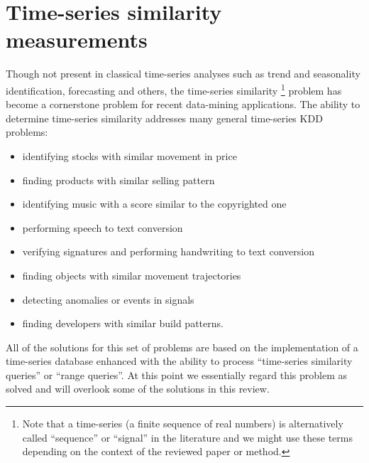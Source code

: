 \chapter{Time-series similarity measurements}
Though not present in classical time-series analyses such as trend and seasonality identification, forecasting and others, the time-series similarity \footnote{Note that a time-series (a finite sequence of real numbers) is alternatively called ``sequence'' or ``signal'' in the literature and we might use these terms depending on the context of the reviewed paper or method.}  problem has become a cornerstone problem for recent data-mining applications. The ability to determine time-series similarity addresses many general time-series KDD problems:
\begin{itemize}
	\item identifying stocks with similar movement in price \cite{citeulike:4384535} \cite{citeulike:4031865} \cite{citeulike:4025073}
	\item finding products with similar selling pattern \cite{citeulike:4326324}
	\item identifying music with a score similar to the copyrighted one \cite{citeulike:3821484} \cite{citeulike:3815076}
	\item performing speech to text conversion \cite{citeulike:3728228}
	\item verifying signatures and performing handwriting to text conversion \cite{citeulike:3733947} \cite{citeulike:3513035}
	\item finding objects with similar movement trajectories \cite{citeulike:964832} \cite{citeulike:3728229} \cite{citeulike:3815864}
	\item detecting anomalies or events in signals \cite{citeulike:4412621} \cite{citeulike:4412617}
	\item finding developers with similar build patterns.
\end{itemize}

All of the solutions for this set of problems are based on the implementation of a time-series database enhanced with the ability to process ``time-series similarity queries'' or ``range queries''. At this point we essentially regard this problem as solved and will overlook some of the solutions in this review. 

